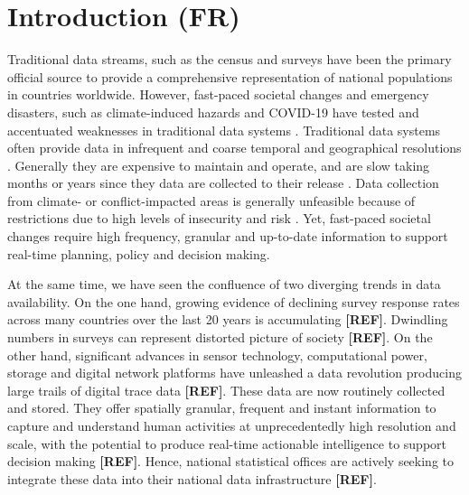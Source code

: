 \documentclass[]{rsos}%
\begin{document}
\newpage

\section{Introduction (FR)}\label{introduction-fr}

Traditional data streams, such as the census and surveys have been the
primary official source to provide a comprehensive representation of
national populations in countries worldwide. However, fast-paced
societal changes and emergency disasters, such as climate-induced hazards and
COVID-19 have tested and accentuated weaknesses in traditional data
systems \citep{green2021}. Traditional data systems often provide data in
infrequent and coarse temporal and geographical resolutions
\citep{rowe23-bigdata}. Generally they are expensive to maintain and operate,
and are slow taking months or years since they data are collected to
their release \citep{rowe23-bigdata}. Data collection from climate- or
conflict-impacted areas is generally unfeasible because of restrictions
due to high levels of insecurity and risk \citep{iradukunda2025}. Yet,
fast-paced societal changes require high frequency, granular
and up-to-date information to support real-time planning, policy and
decision making.

At the same time, we have seen the confluence of two diverging trends in
data availability. On the one hand, growing evidence of
declining survey response rates across many countries over the last 20
years is accumulating \textbf{{[}REF{]}}. Dwindling numbers in surveys can represent distorted
picture of society \textbf{{[}REF{]}}. On the other hand, significant
advances in sensor technology, computational power, storage and digital
network platforms have unleashed a data revolution producing large
trails of digital trace data \textbf{{[}REF{]}}. These data are now routinely
collected and stored. They offer spatially granular, frequent and
instant information to capture and understand human activities at
unprecedentedly high resolution and scale, with the potential to produce
real-time actionable intelligence to support decision making \textbf{{[}REF{]}}.
Hence, national statistical offices are actively seeking to integrate
these data into their national data infrastructure \textbf{{[}REF{]}}.
\end{document}
